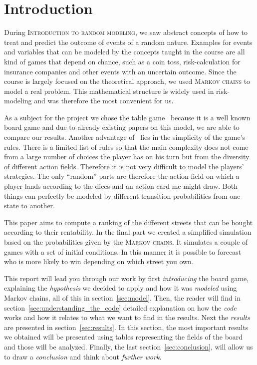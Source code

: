 \section{Introduction} %
\label{sec:introduction}

During \textsc{Introduction to random modeling}, we saw abstract concepts of how to treat and predict the 
outcome of events of a random nature. Examples for events and variables that can be modeled by the 
concepts taught in the course are all kind of games that depend on chance, such as a coin toss, 
risk-calculation for insurance companies and other events with an uncertain outcome. Since the course
is largely focused on the theoretical approach, we used \textsc{Markov chains}	 to model 
a real problem. This mathematical structure is widely used in risk-modeling and was therefore the
most convenient for us. 

As a subject for the project we chose the table game \monopoly~because it is a well known board game and 
due to already existing papers on this model, we are able to compare our results. 
Another advantage of \monopoly~lies in the simplicity of the game's rules. 
There is a limited list of rules so that the main complexity does not come from a large number 
of choices the player has on his turn but from the diversity of different action fields. Therefore it is not
very difficult to model the players' strategies. 
The only ``random'' parts are therefore the action field on which a player lands according to the dices
and an action card me might draw. 
Both things can perfectly be modeled by different transition probabilities from one state to another.

This paper aims to compute a ranking of the different streets that can be bought according to their rentability. 
In the final part we created a simplified simulation based on the probabilities given by the \textsc{Markov 
chains}.
It simulates a couple of games with a set of initial conditions. In this manner it is possible to forecast
who is more likely to win depending on which street you own.

This report will lead you through our work by first \emph{introducing} the board
game, explaining the \emph{hypothesis} we decided to apply and how it
was \emph{modeled} using Markov chains, all of this in section~\ref{sec:model}.
Then, the reader will find in section~\ref{sec:understanding_the_code}
detailed explanation on how the \emph{code} works and how it relates
to what we want to find in the results.
Next the \emph{results} are presented in section~\ref{sec:results}.
In this section, the most important results we obtained will be 
presented using tables representing the fields of the board
and those will be analyzed.
Finally, the last section~\ref{sec:conclusion}, will allow us
to draw a \emph{conclusion} and think about \emph{further work}.

